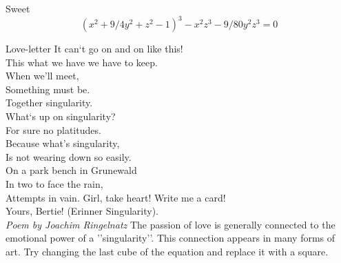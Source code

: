 \begin{surferPage}{Sweet}
\[(x^2+ 9/4y^2	+ z^2- 1)^3- x^2z^3	- 9/80y^2z^3	= 0\]

\singlespacing
Love-letter
\singlespacing
It can`t go on and on like this!\\
This what we have we have to keep.\\
When we'll meet,\\
Something must be.\\
Together singularity.\\
What`s up on singularity?\\
For sure no platitudes.\\
Because what's singularity,\\
Is not wearing down so easily.\\
On a park bench in Grunewald\\
In two to face the rain,\\
Attempts in vain. Girl, take heart! Write me a card!\\
Yours, Bertie! (Erinner Singularity).\\
{\it Poem by Joachim Ringelnatz}
\singlespacing 
The passion of love is generally connected to the emotional power of a ''singularity''. This connection appears in many forms of art.
\singlespacing 
Try changing the last cube of the equation and replace it with a square.
\end{surferPage}
